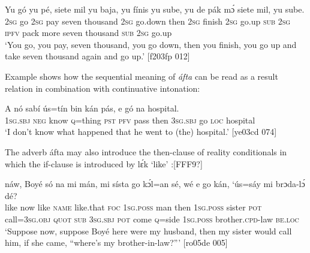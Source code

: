 \ea%
    \label{ex:key:1355}
    \gll Yu  gó  yu  pé,  siete  mil      yu  baja,      yu  fínis    yu  sube,
  yu  de  pák    mɔ́    siete  mil,        yu  sube.\\
\textsc{2sg}  go  \textsc{2sg}  pay  seven  thousand  \textsc{2sg}  go.down  then  \textsc{2sg}  finish  \textsc{2sg}  go.up
\textsc{sub}  \textsc{2sg}  \textsc{ipfv}  pack  more  seven  thousand  \textsc{sub}  \textsc{2sg}  go.up\\

\glt ‘You go, you pay, seven thousand, you go down, then you finish, you 
go up and take seven thousand again and go up.’ [f203fp 012]
\z

Example  shows how the sequential meaning of \textit{áfta} can be read as a result relation in combination with continuative intonation:


\ea%
    \label{ex:key:1356}
    \gll \MakeUppercase{A}   nó  sabí    ús=tín  bin  kán  pás,        e    gó  
na  hospital.\\
\textsc{1sg.sbj}  \textsc{neg}  know  \textsc{q}=thing  \textsc{pst}  \textsc{pfv}  pass    then  \textsc{3sg.sbj}  go 
\textsc{loc}  hospital\\
\glt ‘I don’t know what happened that he went to (the) hospital.’ [ye03cd 074]
\z

The adverb áfta may also introduce the then-clause of reality conditionals in which the if-clause is introduced by lɛ́k ‘like’ :[FFF9?]


\ea%
    \label{ex:key:1357}
    \gll {}  náw,    Boyé  só    na  mi    mán,      mi    sísta  
go  kɔ́l=an    sé,    wé  e    go  kán,    ‘ús=sáy  mi
brɔda-lɔ́      dé?\\
like  now    like  \textsc{name}  like.that  \textsc{foc}  \textsc{1sg.poss}  man    then  \textsc{1sg.poss}  sister
\textsc{pot}  call=\textsc{3sg.obj}  \textsc{quot}    \textsc{sub}  \textsc{3sg.sbj}  \textsc{pot}  come   \textsc{q}=side  \textsc{1sg.poss}
brother.\textsc{cpd}{}-law  \textsc{be.loc}\\

\glt ‘Suppose now, suppose Boyé here were my husband, then my sister would 
call him, if she came, “where’s my brother-in-law?”’ [ro05de 005]
\z

